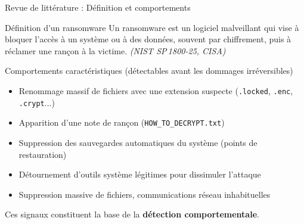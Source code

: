 \documentclass[aspectratio=169,t,10pt]{beamer}
\begin{document}
\begin{frame}{Revue de littérature : Définition et comportements}

  \begin{block}{Définition d'un ransomware}
    Un ransomware est un logiciel malveillant qui vise à bloquer l'accès à un
    système ou à des données, souvent par chiffrement, puis à réclamer une rançon
    à la victime. \textit{(NIST SP\,1800-25, CISA)}
  \end{block}

  \vspace{4pt}

  \begin{block}{Comportements caractéristiques (détectables avant les dommages irréversibles)}
    \begin{itemize}\setlength\itemsep{2pt}
      \item Renommage massif de fichiers avec une extension suspecte
            (\texttt{.locked}, \texttt{.enc}, \texttt{.crypt}...)
      \item Apparition d'une note de rançon (\texttt{HOW\_TO\_DECRYPT.txt})
      \item Suppression des sauvegardes automatiques du système (points de restauration)
      \item Détournement d'outils système légitimes pour dissimuler l'attaque
      \item Suppression massive de fichiers, communications réseau inhabituelles
    \end{itemize}
    Ces signaux constituent la base de la \textbf{détection comportementale}.
  \end{block}

\end{frame}
\end{document}
